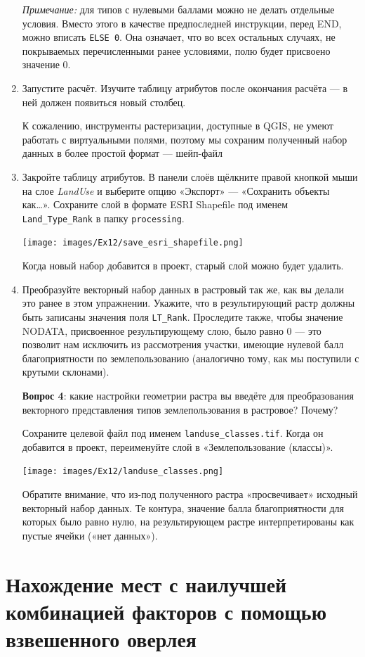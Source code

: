 \documentclass[
  12pt,
]{book}
\begin{document}
\begin{enumerate}
  \emph{Примечание:} для типов с нулевыми баллами можно не делать отдельные условия. Вместо этого в качестве предпоследней инструкции, перед END, можно вписать \texttt{ELSE\ 0}. Она означает, что во всех остальных случаях, не покрываемых перечисленными ранее условиями, полю будет присвоено значение 0.
\item
  Запустите расчёт. Изучите таблицу атрибутов после окончания расчёта --- в ней должен появиться новый столбец.

  К сожалению, инструменты растеризации, доступные в QGIS, не умеют работать с виртуальными полями, поэтому мы сохраним полученный набор данных в более простой формат --- шейп-файл
\item
  Закройте таблицу атрибутов. В панели слоёв щёлкните правой кнопкой мыши на слое \emph{LandUse} и выберите опцию «Экспорт» --- «Сохранить объекты как\ldots». Сохраните слой в формате ESRI Shapefile под именем \texttt{Land\_Type\_Rank} в папку \texttt{processing}.

  \texttt{[image: images/Ex12/save\_esri\_shapefile.png]}

  Когда новый набор добавится в проект, старый слой можно будет удалить.
\item
  Преобразуйте векторный набор данных в растровый так же, как вы делали это ранее в этом упражнении. Укажите, что в результирующий растр должны быть записаны значения поля \texttt{LT\_Rank}. Проследите также, чтобы значение NODATA, присвоенное результирующему слою, было равно 0 --- это позволит нам исключить из рассмотрения участки, имеющие нулевой балл благоприятности по землепользованию (аналогично тому, как мы поступили с крутыми склонами).

  \textbf{Вопрос 4}: какие настройки геометрии растра вы введёте для преобразования векторного представления типов землепользования в растровое? Почему?

  Сохраните целевой файл под именем \texttt{landuse\_classes.tif}. Когда он добавится в проект, переименуйте слой в «Землепользование (классы)».

  \texttt{[image: images/Ex12/landuse\_classes.png]}

  Обратите внимание, что из-под полученного растра «просвечивает» исходный векторный набор данных. Те контура, значение балла благоприятности для которых было равно нулю, на результирующем растре интерпретированы как пустые ячейки («нет данных»).
\end{enumerate}

\hypertarget{weighted-overlay-combination}{%
\section{Нахождение мест с наилучшей комбинацией факторов с помощью взвешенного оверлея}\label{weighted-overlay-combination}}
\end{document}
